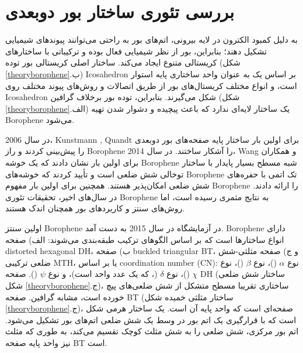 \section{بررسی تئوری ساختار بور دوبعدی}
به دلیل کمبود الکترون در لایه بیرونی، اتم‌های بور به راحتی می‌توانند پیوندهای شیمیایی تشکیل دهند؛ بنابراین، بور از نظر شیمیایی فعال بوده و ترکیباتی با ساختارهای کریستالی متنوع ایجاد می‌کند. ساختار اصلی کریستالی بور توده (شکل \ref{theoryborophene}.ب) \gls{Icosahedron} بر اساس یک  به عنوان واحد ساختاری پایه استوار است، و انواع مختلف کریستال‌های بور از طریق اتصالات و روش‌های پیوند مختلف روی \gls{Icosahedron}  شکل می‌گیرند. \cite{albertBoronElementaryChallenge2009} بنابراین، توده بور برخلاف گرافین (شکل \ref{theoryborophene}.الف) یک ساختار لایه‌ای ندارد که باعث پیچیده و دشوار شدن تهیه \gls{Borophene} می‌شود.

در سال 2006، \gls{Kunstmann} , \gls{Quandt} \cite{kunstmannBroadBoronSheets2006} برای اولین بار ساختار پایه صفحه‌های بور دوبعدی را پیش‌بینی کردند و راز \gls{Borophene} را آشکار ساختند. در سال 2014، \gls{Wang} و همکاران \cite{zhaiObservationAllboronFullerene2014} برای اولین بار نشان دادند که  یک خوشه \gls{Borophene} شبه مسطح بسیار پایدار با ساختار توخالی شش ضلعی است و تأیید کردند که خوشه‌های \gls{Borophene} تک اتمی با حفره‌های شش ضلعی امکان‌پذیر هستند. همچنین برای اولین بار مفهوم \gls{Borophene} را ارائه دادند. در سال‌های اخیر، تحقیقات تئوری \gls{Borophene} به نتایج مثمری رسیده است، اما روش‌های سنتز و کاربردهای بور همچنان اندک هستند.

اولین سنتز \gls{Borophene} در آزمایشگاه در سال 2015 به دست آمد. \gls{Borophene} دارای انواع ساختارها است که بر اساس الگوهای ترکیب طبقه‌بندی می‌شوند: الف) صفحه \gls{distorted hexagonal} \gls{DH}، ب) صفحه \gls{buckled triangular} \gls{BT}، و ج) صفحه مثلثی-شش ضلعی ترکیبی \gls{MTH}، یا بر اساس \gls{coordination number} (\gls{CN}): نوع $\alpha$ ()، نوع $\beta$ ()، نوع $\chi$ ()، نوع $\delta$ (، که  یک عدد واحد است)، و نوع $\psi$ ().\cite{wuTwoDimensionalBoronMonolayer2012}
صفحه \gls{DH} (ساختار شش ضلعی شکل \ref{theoryborophene}.ج)، ساختاری تقریبا مسطح متشکل از شش ضلعی‌های پیچ خورده \cite{bezuglyHighlyConductiveBoron2011}است، مشابه گرافین. صفحه \gls{BT} (ساختار مثلثی خمیده شکل \ref{theoryborophene}.ج)، صفحه‌ای است که واحد پایه آن  است.  یک ساختار هرمی شکل است که با قرارگیری یک اتم بور در وسط یک شش ضلعی اتم‌های بور تشکیل می‌شود. \cite{mannixSynthesisBorophenesAnisotropic2015, wuTwoDimensionalBoronMonolayer2012} اتم بور مرکزی، شش ضلعی را به شش مثلث کوچک تقسیم می‌کند، به طوری که مثلث نیز واحد پایه صفحه \gls{BT} است.

